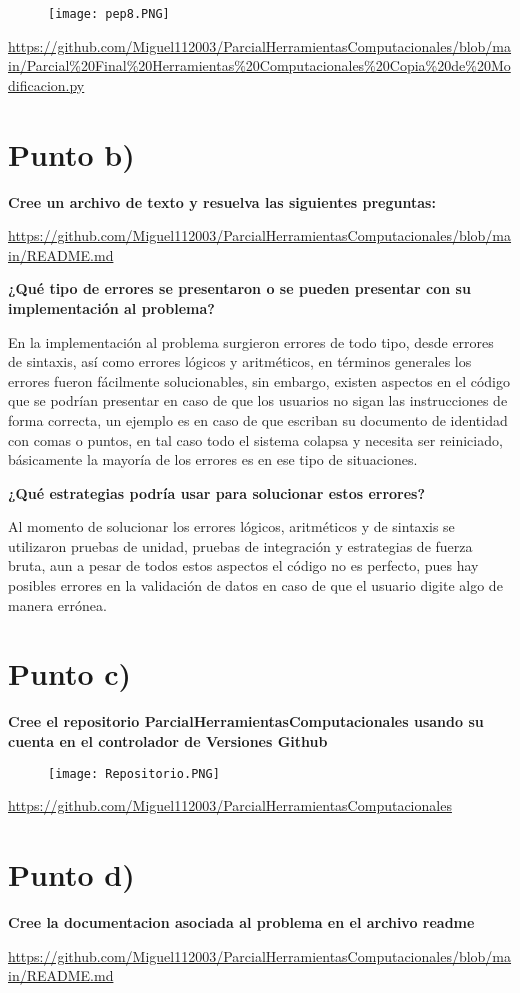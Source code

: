 \documentclass[a4paper,11pt]{article}
\theoremstyle{mytheor}
\begin{document}
\begin{figure}[h]
    \centering
    \texttt{[image: pep8.PNG]}
    \label{fig:my_label}
\end{figure}

\url{https://github.com/Miguel112003/ParcialHerramientasComputacionales/blob/main/Parcial%20Final%20Herramientas%20Computacionales%20Copia%20de%20Modificacion.py}

\section*{Punto b)}

\textbf{Cree un archivo de texto y resuelva las siguientes preguntas:}

\url{https://github.com/Miguel112003/ParcialHerramientasComputacionales/blob/main/README.md}

\textbf{¿Qué tipo de errores se presentaron o se pueden presentar con su implementación al problema?}

En la implementación al problema surgieron errores de todo tipo, desde errores de sintaxis, así como errores lógicos y aritméticos, en términos generales los errores fueron fácilmente
solucionables, sin embargo, existen aspectos en el código que se podrían presentar en caso de que los usuarios no sigan las instrucciones de forma correcta, un ejemplo es en caso de que escriban su documento de identidad con comas o puntos, en tal caso todo el sistema colapsa y necesita ser reiniciado, básicamente la mayoría de los errores es en ese tipo de situaciones.

\textbf{¿Qué estrategias podría usar para solucionar estos errores?}

Al momento de solucionar los errores lógicos, aritméticos y de sintaxis se utilizaron pruebas de unidad, pruebas de integración y estrategias de fuerza bruta, aun a pesar de todos estos aspectos el código no es perfecto, pues hay posibles errores en la validación de datos en caso de que el usuario digite algo de manera errónea.


\section*{Punto c)}
\textbf{Cree el repositorio ParcialHerramientasComputacionales usando su cuenta
en el controlador de Versiones Github}

\begin{figure}[h]
    \centering
    \texttt{[image: Repositorio.PNG]}
    \label{fig:my_label}
\end{figure}

\url{https://github.com/Miguel112003/ParcialHerramientasComputacionales}

\section*{Punto d)}

\textbf{Cree la documentacion asociada al problema en el archivo readme}

\url{https://github.com/Miguel112003/ParcialHerramientasComputacionales/blob/main/README.md}
\end{document}
